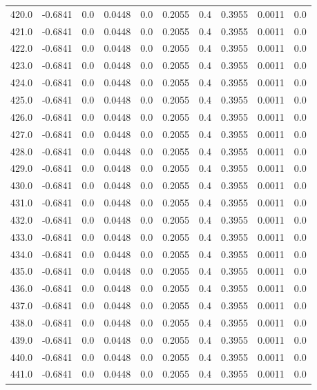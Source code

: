 \begin{longtable}{lrrrrrrrrr}
420.0 & -0.6841 & 0.0 & 0.0448 & 0.0 & 0.2055 & 0.4 & 0.3955 & 0.0011 & 0.0 \\
421.0 & -0.6841 & 0.0 & 0.0448 & 0.0 & 0.2055 & 0.4 & 0.3955 & 0.0011 & 0.0 \\
422.0 & -0.6841 & 0.0 & 0.0448 & 0.0 & 0.2055 & 0.4 & 0.3955 & 0.0011 & 0.0 \\
423.0 & -0.6841 & 0.0 & 0.0448 & 0.0 & 0.2055 & 0.4 & 0.3955 & 0.0011 & 0.0 \\
424.0 & -0.6841 & 0.0 & 0.0448 & 0.0 & 0.2055 & 0.4 & 0.3955 & 0.0011 & 0.0 \\
425.0 & -0.6841 & 0.0 & 0.0448 & 0.0 & 0.2055 & 0.4 & 0.3955 & 0.0011 & 0.0 \\
426.0 & -0.6841 & 0.0 & 0.0448 & 0.0 & 0.2055 & 0.4 & 0.3955 & 0.0011 & 0.0 \\
427.0 & -0.6841 & 0.0 & 0.0448 & 0.0 & 0.2055 & 0.4 & 0.3955 & 0.0011 & 0.0 \\
428.0 & -0.6841 & 0.0 & 0.0448 & 0.0 & 0.2055 & 0.4 & 0.3955 & 0.0011 & 0.0 \\
429.0 & -0.6841 & 0.0 & 0.0448 & 0.0 & 0.2055 & 0.4 & 0.3955 & 0.0011 & 0.0 \\
430.0 & -0.6841 & 0.0 & 0.0448 & 0.0 & 0.2055 & 0.4 & 0.3955 & 0.0011 & 0.0 \\
431.0 & -0.6841 & 0.0 & 0.0448 & 0.0 & 0.2055 & 0.4 & 0.3955 & 0.0011 & 0.0 \\
432.0 & -0.6841 & 0.0 & 0.0448 & 0.0 & 0.2055 & 0.4 & 0.3955 & 0.0011 & 0.0 \\
433.0 & -0.6841 & 0.0 & 0.0448 & 0.0 & 0.2055 & 0.4 & 0.3955 & 0.0011 & 0.0 \\
434.0 & -0.6841 & 0.0 & 0.0448 & 0.0 & 0.2055 & 0.4 & 0.3955 & 0.0011 & 0.0 \\
435.0 & -0.6841 & 0.0 & 0.0448 & 0.0 & 0.2055 & 0.4 & 0.3955 & 0.0011 & 0.0 \\
436.0 & -0.6841 & 0.0 & 0.0448 & 0.0 & 0.2055 & 0.4 & 0.3955 & 0.0011 & 0.0 \\
437.0 & -0.6841 & 0.0 & 0.0448 & 0.0 & 0.2055 & 0.4 & 0.3955 & 0.0011 & 0.0 \\
438.0 & -0.6841 & 0.0 & 0.0448 & 0.0 & 0.2055 & 0.4 & 0.3955 & 0.0011 & 0.0 \\
439.0 & -0.6841 & 0.0 & 0.0448 & 0.0 & 0.2055 & 0.4 & 0.3955 & 0.0011 & 0.0 \\
440.0 & -0.6841 & 0.0 & 0.0448 & 0.0 & 0.2055 & 0.4 & 0.3955 & 0.0011 & 0.0 \\
441.0 & -0.6841 & 0.0 & 0.0448 & 0.0 & 0.2055 & 0.4 & 0.3955 & 0.0011 & 0.0 \\

\end{longtable}
